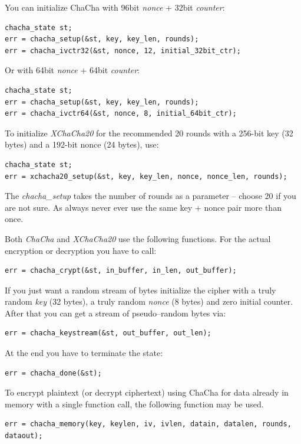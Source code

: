 \documentclass[synpaper]{book}
\begin{document}
You can initialize ChaCha with 96bit \textit{nonce} + 32bit \textit{counter}:
\begin{verbatim}
chacha_state st;
err = chacha_setup(&st, key, key_len, rounds);
err = chacha_ivctr32(&st, nonce, 12, initial_32bit_ctr);
\end{verbatim}

Or with 64bit \textit{nonce} + 64bit \textit{counter}:
\begin{verbatim}
chacha_state st;
err = chacha_setup(&st, key, key_len, rounds);
err = chacha_ivctr64(&st, nonce, 8, initial_64bit_ctr);
\end{verbatim}

To initialize \textit{XChaCha20} for the recommended 20 rounds with a 256-bit
key (32 bytes) and a 192-bit nonce (24 bytes), use:
\begin{verbatim}
chacha_state st;
err = xchacha20_setup(&st, key, key_len, nonce, nonce_len, rounds);
\end{verbatim}

The \textit{chacha\_setup} takes the number of rounds as a parameter -- choose 20 if you are not sure.
As always never ever use the same key + nonce pair more than once.

Both \textit{ChaCha} and \textit{XChaCha20} use the following functions.
For the actual encryption or decryption you have to call:
\begin{verbatim}
err = chacha_crypt(&st, in_buffer, in_len, out_buffer);
\end{verbatim}

If you just want a random stream of bytes initialize the cipher with a truly random \textit{key} (32 bytes),
a truly random \textit{nonce} (8 bytes) and zero initial counter. After that you can get a stream of pseudo--random
bytes via:
\begin{verbatim}
err = chacha_keystream(&st, out_buffer, out_len);
\end{verbatim}

At the end you have to terminate the state:
\begin{verbatim}
err = chacha_done(&st);
\end{verbatim}

To encrypt plaintext (or decrypt ciphertext) using ChaCha for data already in
memory with a single function call, the following function may be used.
\begin{verbatim}
err = chacha_memory(key, keylen, iv, ivlen, datain, datalen, rounds, dataout);
\end{verbatim}
\end{document}
